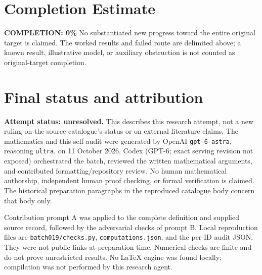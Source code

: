 \documentclass[11pt]{article}
\begin{document}
\section{Completion Estimate}
\noindent\textbf{COMPLETION: 0\%}
No substantiated new progress toward the entire original target is claimed. The worked results and failed route are delimited above; a known result, illustrative model, or auxiliary obstruction is not counted as original-target completion.

\section{Final status and attribution}
\textbf{Attempt status: unresolved.} This describes this research attempt, not a new ruling on the source catalogue's status or on external literature claims.
The mathematics and this self-audit were generated by OpenAI \texttt{gpt-6-astra}, reasoning \texttt{ultra}, on 11 October 2026. Codex (GPT-6; exact serving revision not exposed) orchestrated the batch, reviewed the written mathematical arguments, and contributed formatting/repository review. No human mathematical authorship, independent human proof checking, or formal verification is claimed. The historical preparation paragraphs in the reproduced catalogue body concern that body only.

Contribution prompt A was applied to the complete definition and supplied source record, followed by the adversarial checks of prompt B. Local reproduction files are \texttt{batch019/checks.py}, \texttt{computations.json}, and the per-ID audit JSON. They were not public links at preparation time. Numerical checks are finite and do not prove unrestricted results. No LaTeX engine was found locally; compilation was not performed by this research agent.
\end{document}
